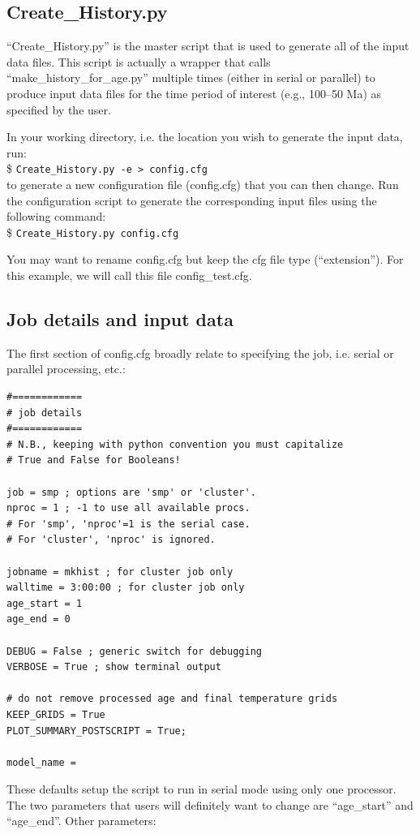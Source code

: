 \documentclass[letterpaper,12pt]{article}
\newcommand{\tm}[1]{\$ \texttt{#1}}
\begin{document}
\subsection{Create\_History.py}
``Create\_History.py'' is the master script that is used to generate all of the input data files.
This script is actually a wrapper that calls ``make\_history\_for\_age.py'' multiple times (either in serial or parallel) to produce input data files for the time period of interest (e.g., 100--50 Ma) as specified by the user.

In your working directory, i.e. the location you wish to generate the input data, run:\\
\tm{Create\_History.py -e > config.cfg}\\ to generate a new configuration file (config.cfg) that you can then change.  Run the configuration script to generate the corresponding input files using the following command:\\
\tm{Create\_History.py config.cfg}

You may want to rename config.cfg but keep the cfg file type (``extension''). For this example, we will call this file config\_test.cfg. 

\subsection{Job details and input data}
The first section of config.cfg broadly relate to specifying the job, i.e. serial or parallel processing, etc.:
\begin{verbatim}
#============
# job details
#============
# N.B., keeping with python convention you must capitalize
# True and False for Booleans!

job = smp ; options are 'smp' or 'cluster'.
nproc = 1 ; -1 to use all available procs.
# For 'smp', 'nproc'=1 is the serial case.
# For 'cluster', 'nproc' is ignored.

jobname = mkhist ; for cluster job only
walltime = 3:00:00 ; for cluster job only
age_start = 1
age_end = 0

DEBUG = False ; generic switch for debugging
VERBOSE = True ; show terminal output

# do not remove processed age and final temperature grids
KEEP_GRIDS = True
PLOT_SUMMARY_POSTSCRIPT = True;

model_name =
\end{verbatim}
These defaults setup the script to run in serial mode using only one processor.  The two parameters that users will definitely want to change are ``age\_start'' and ``age\_end''.  Other parameters:
\end{document}
